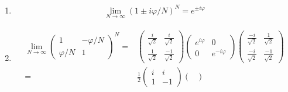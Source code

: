 \begin{enumerate}
If $t = 1-i\varphi/N,$  choose the eigenvector 
$\frac{1}{\sqrt{2}}\begin{pmatrix}
    i\\-1
\end{pmatrix}.$
Thus 
$$
\begin{pmatrix}
    1+ i\varphi/N & 0 \\
    0 & 1-i\varphi/N
\end{pmatrix}
=
\begin{pmatrix}
    \frac{-i}{\sqrt{2}} & \frac{1}{\sqrt{2}}\\
    \frac{-i}{\sqrt{2}} & \frac{-1}{\sqrt{2}}
\end{pmatrix}
\begin{pmatrix}
    1 & -\varphi/N\\
    \varphi/N & 1
\end{pmatrix}
\begin{pmatrix}
    \frac{i}{\sqrt{2}} & \frac{i}{\sqrt{2}}\\
    \frac{1}{\sqrt{2}} & \frac{-1}{\sqrt{2}}
\end{pmatrix}
$$
\item 
\begin{align*}
    \lim_{N\to\infty}(1\pm i\varphi/N)^N = 
    e^{\pm i\varphi}
\end{align*}
\item 
\begin{align*}
    \lim_{N\to\infty}
    \begin{pmatrix}
        1 & -\varphi/N\\
        \varphi/N & 1
    \end{pmatrix}^N
    = & 
    \begin{pmatrix}
    \frac{i}{\sqrt{2}} & \frac{i}{\sqrt{2}}\\
    \frac{1}{\sqrt{2}} & \frac{-1}{\sqrt{2}}
\end{pmatrix}
\begin{pmatrix}
    e^{i\varphi} & 0\\
    0 & e^{-i\varphi}
\end{pmatrix}
\begin{pmatrix}
    \frac{-i}{\sqrt{2}} & \frac{1}{\sqrt{2}}\\
    \frac{-i}{\sqrt{2}} & \frac{-1}{\sqrt{2}}
\end{pmatrix}\\
=&
\frac{1}{2}
\begin{pmatrix}
    i & i \\
    1 & -1 
\end{pmatrix}
\begin{pmatrix}

\end{pmatrix}
\end{align*}
\end{enumerate}
